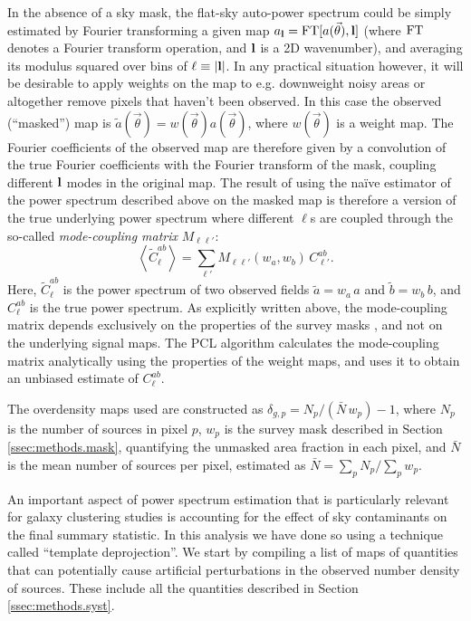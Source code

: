 \documentclass[a4paper,11pt]{article}
\newcommand{\nv}{\vec{\theta}}
\begin{document}
    In the absence of a sky mask, the flat-sky auto-power spectrum could be simply estimated by Fourier transforming a given map $a_{\bf l}={\rm FT}[a(\nv),{\bf l}]$ (where ${\rm FT}$ denotes a Fourier transform operation, and ${\bf l}$ is a 2D wavenumber), and averaging its modulus squared over bins of $\ell\equiv|{\bf l}|$. In any practical situation however, it will be desirable to apply weights on the map to e.g. downweight noisy areas or altogether remove pixels that haven't been observed. In this case the observed (``masked'') map is $\tilde{a}(\nv)=w(\nv)a(\nv)$, where $w(\nv)$ is a weight map. The Fourier coefficients of the observed map are therefore given by a convolution of the true Fourier coefficients with the Fourier transform of the mask, coupling different ${\bf l}$ modes in the original map. The result of using the na\"ive estimator of the power spectrum described above on the masked map is therefore a version of the true underlying power spectrum where different $\ell$s are coupled through the so-called {\sl mode-coupling matrix} $M_{\ell\ell'}$:
    \begin{equation}
      \left\langle \tilde{C}^{ab}_\ell \right\rangle = \sum_{\ell'} M_{\ell\ell'}(w_a,w_b)\,C^{ab}_{\ell'}.
    \end{equation}
    Here, $\tilde{C}^{ab}_\ell$ is the power spectrum of two observed fields $\tilde{a}=w_a\,a$ and $\tilde{b}=w_b\,b$, and $C^{ab}_\ell$ is the true power spectrum. As explicitly written above, the mode-coupling matrix depends exclusively on the properties of the survey masks \citep{2002ApJ...567....2H}, and not on the underlying signal maps. The PCL algorithm calculates the mode-coupling matrix analytically using the properties of the weight maps, and uses it to obtain an unbiased estimate of $C^{ab}_\ell$.
    
    The overdensity maps used are constructed as $\delta_{g,p}=N_p/(\bar{N}\,w_p)-1$, where $N_p$ is the number of sources in pixel $p$, $w_p$ is the survey mask described in Section \ref{ssec:methods.mask}, quantifying the unmasked area fraction in each pixel, and $\bar{N}$ is the mean number of sources per pixel, estimated as $\bar{N}=\sum_p N_p/\sum_p w_p$.
    
    An important aspect of power spectrum estimation that is particularly relevant for galaxy clustering studies is accounting for the effect of sky contaminants on the final summary statistic. In this analysis we have done so using a technique called ``template deprojection''. We start by compiling a list of maps of quantities that can potentially cause artificial perturbations in the observed number density of sources. These include all the quantities described in Section \ref{ssec:methods.syst}.
    
\end{document}
